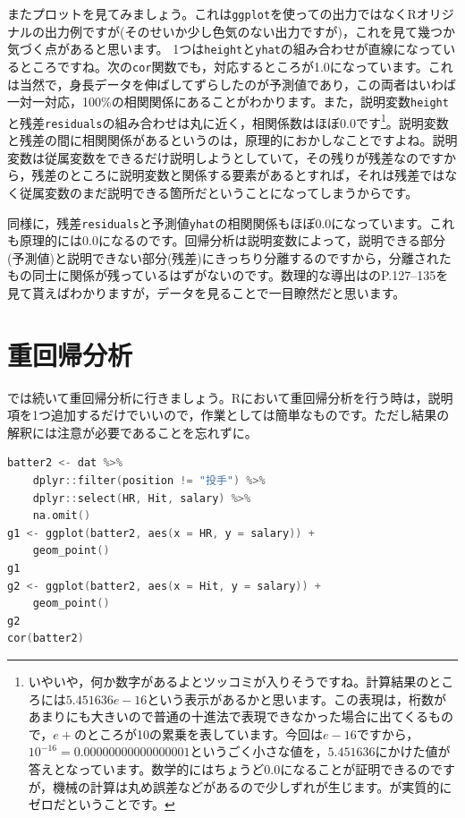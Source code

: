 \documentclass{ltjbook}
\begin{document}
またプロットを見てみましょう。これは\texttt{ggplot}を使っての出力ではなくRオリジナルの出力例ですが(そのせいか少し色気のない出力ですが)，これを見て幾つか気づく点があると思います。
1つは\verb|height|と\verb|yhat|の組み合わせが直線になっているところですね。次の\verb|cor|関数でも，対応するところが1.0になっています。これは当然で，身長データを伸ばしてずらしたのが予測値であり，この両者はいわば一対一対応，100\%の相関関係にあることがわかります。また，説明変数\verb|height|と残差\verb|residuals|の組み合わせは丸に近く，相関係数はほぼ0.0です\footnote{いやいや，何か数字があるよとツッコミが入りそうですね。計算結果のところには$5.451636e-16$という表示があるかと思います。この表現は，桁数があまりにも大きいので普通の十進法で表現できなかった場合に出てくるもので，$e+$のところが10の累乗を表しています。今回は$e-16$ですから，$10^{-16}=0.00000000000000001$というごく小さな値を，$5.451636$にかけた値が答えとなっています。数学的にはちょうど$0.0$になることが証明できるのですが，機械の計算は丸め誤差などがあるので少しずれが生じます。が実質的にゼロだということです。}。説明変数と残差の間に相関関係があるというのは，原理的におかしなことですよね。説明変数は従属変数をできるだけ説明しようとしていて，その残りが残差なのですから，残差のところに説明変数と関係する要素があるとすれば，それは残差ではなく従属変数のまだ説明できる箇所だということになってしまうからです。

同様に，残差\verb|residuals|と予測値\verb|yhat|の相関関係もほぼ0.0になっています。これも原理的には$0.0$になるのです。回帰分析は説明変数によって，説明できる部分(予測値)と説明できない部分(残差)にきっちり分離するのですから，分離されたもの同士に関係が残っているはずがないのです。数理的な導出は\citet{kosugi2018}のP.127--135を見て貰えばわかりますが，データを見ることで一目瞭然だと思います。
\section{重回帰分析}
では続いて重回帰分析に行きましょう。Rにおいて重回帰分析を行う時は，説明項を1つ追加するだけでいいので，作業としては簡単なものです。ただし結果の解釈には注意が必要であることを忘れずに。

\begin{lstlisting}[language=c++,label={code::11_06},caption={重回帰分析のデータを作って可視化}]
batter2 <- dat %>%
    dplyr::filter(position != "投手") %>%
    dplyr::select(HR, Hit, salary) %>%
    na.omit()
g1 <- ggplot(batter2, aes(x = HR, y = salary)) +
    geom_point()
g1
g2 <- ggplot(batter2, aes(x = Hit, y = salary)) +
    geom_point()
g2
cor(batter2)
\end{lstlisting}
\end{document}
